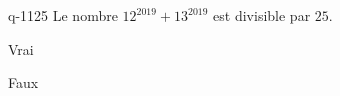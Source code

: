 \begin{truefalse}{q-1125}
Le nombre $12^{2019} + 13^{2019}$ est divisible par $25$.
\item* Vrai
\item Faux
\end{truefalse}

